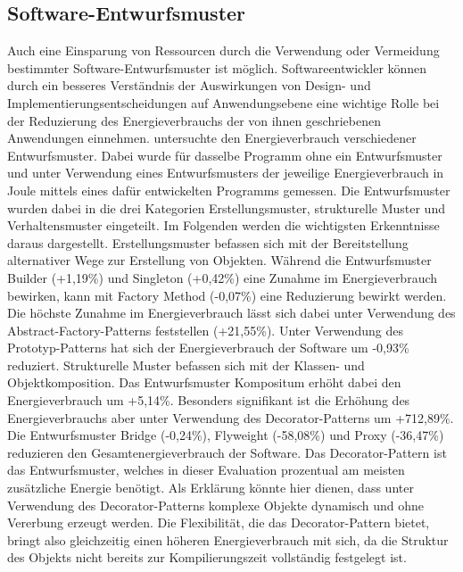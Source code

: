 \documentclass[utf8,biblatex]{lni}
\begin{document}
\subsection{Software-Entwurfsmuster}
\label{SWP}
Auch eine Einsparung von Ressourcen durch die Verwendung oder Vermeidung bestimmter Software-Entwurfsmuster ist möglich. Softwareentwickler können durch ein besseres Verständnis der Auswirkungen von Design- und Implementierungsentscheidungen auf Anwendungsebene eine wichtige Rolle bei der Reduzierung des Energieverbrauchs der von ihnen geschriebenen Anwendungen einnehmen. \cite{Sahin12}
\newline
\cite{Sahin12} untersuchte den Energieverbrauch verschiedener Entwurfsmuster. Dabei wurde für dasselbe Programm ohne ein Entwurfsmuster und unter Verwendung eines Entwurfsmusters der jeweilige Energieverbrauch in Joule mittels eines dafür entwickelten Programms gemessen. Die Entwurfsmuster wurden dabei in die drei Kategorien Erstellungsmuster, strukturelle Muster und Verhaltensmuster eingeteilt. Im Folgenden werden die wichtigsten Erkenntnisse daraus dargestellt.
\newline
Erstellungsmuster befassen sich mit der Bereitstellung alternativer Wege zur Erstellung von Objekten. Während die Entwurfsmuster Builder (+1,19\%) und Singleton (+0,42\%) eine Zunahme im Energieverbrauch bewirken, kann mit Factory Method (-0,07\%) eine Reduzierung bewirkt werden. Die höchste Zunahme im Energieverbrauch lässt sich dabei unter Verwendung des Abstract-Factory-Patterns feststellen (+21,55\%). Unter Verwendung des Prototyp-Patterns hat sich der Energieverbrauch der Software um -0,93\% reduziert.
\newline
Strukturelle Muster befassen sich mit der Klassen- und Objektkomposition. Das Entwurfsmuster Kompositum erhöht dabei den Energieverbrauch um +5,14\%. Besonders signifikant ist die Erhöhung des Energieverbrauchs aber unter Verwendung des Decorator-Patterns um +712,89\%. Die Entwurfsmuster Bridge (-0,24\%), Flyweight (-58,08\%) und Proxy (-36,47\%) reduzieren den Gesamtenergieverbrauch der Software. 
Das Decorator-Pattern ist das Entwurfsmuster, welches in dieser Evaluation prozentual am meisten zusätzliche Energie benötigt. Als Erklärung könnte hier dienen, dass unter Verwendung des Decorator-Patterns komplexe Objekte dynamisch und ohne Vererbung erzeugt werden. Die Flexibilität, die das Decorator-Pattern bietet, bringt also gleichzeitig einen höheren Energieverbrauch mit sich, da die Struktur des Objekts nicht bereits zur Kompilierungszeit vollständig festgelegt ist. 
\end{document}

